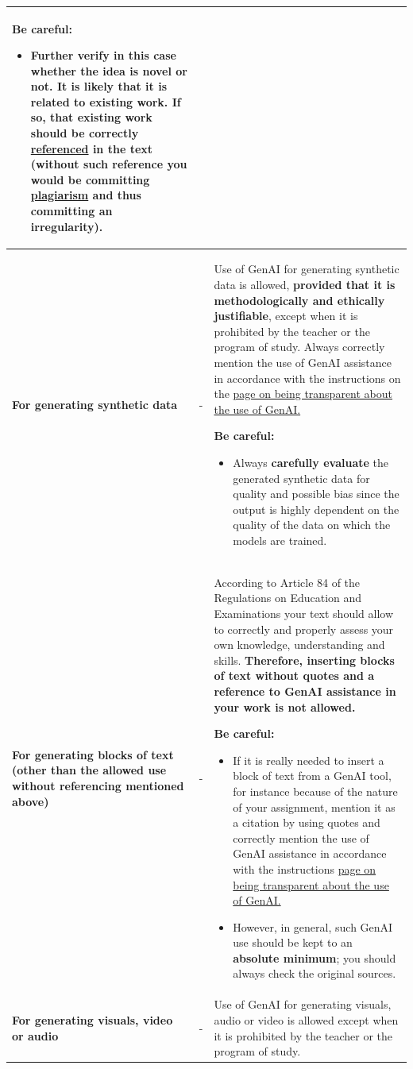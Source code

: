 \begin{longtable}{|p{}|p{}|p{}|}
\medskip
\textbf{Be careful:}
\begin{itemize}
    \item Further verify in this case whether the idea is novel or not. It is likely that it is related to existing work. \textbf{If so, that existing work should be correctly \href{https://bib.kuleuven.be/english/training-and-tutorials/citation}{referenced} in the text} (without such reference you would be committing \href{https://www.kuleuven.be/english/education/plagiarism/index}{plagiarism} and thus committing an irregularity).
\end{itemize}\\ \hline
\textbf{For generating synthetic data} & - & Use of GenAI for generating synthetic data is allowed, \textbf{provided that it is methodologically and ethically justifiable}, except when it is prohibited by the teacher or the program of study. Always correctly mention the use of GenAI assistance in accordance with the instructions on the \href{https://www.kuleuven.be/english/education/student/educational-tools/generative-artificial-intelligence#Transparency}{page on being transparent about the use of GenAI.}

\medskip
\textbf{Be careful:}
\begin{itemize}
    \item Always \textbf{carefully evaluate} the generated synthetic data for quality and possible bias since the output is highly dependent on the quality of the data on which the models are trained.
\end{itemize} \\ \hline
\textbf{For generating blocks of text
(other than the allowed use without referencing mentioned above)
} & - & According to Article 84 of the Regulations on Education and Examinations your text should allow to correctly and properly assess your own knowledge, understanding and skills. \textbf{Therefore, inserting blocks of text without quotes and a reference to GenAI assistance in your work is not allowed. }

\medskip
\textbf{Be careful:}
\begin{itemize}
    \item If it is really needed to insert a block of text from a GenAI tool, for instance because of the nature of your assignment, mention it as a citation by using quotes and correctly mention the use of GenAI assistance in accordance with the instructions \href{https://www.kuleuven.be/english/education/student/educational-tools/generative-artificial-intelligence#Transparency}{page on being transparent about the use of GenAI.}
    \item However, in general, such GenAI use should be kept to an \textbf{absolute minimum}; you should always check the original sources.
\end{itemize} \\ \hline
\textbf{For generating visuals, video or audio} & - & Use of GenAI for generating visuals, audio or video is allowed except when it is prohibited by the teacher or the program of study. 


\end{longtable}

